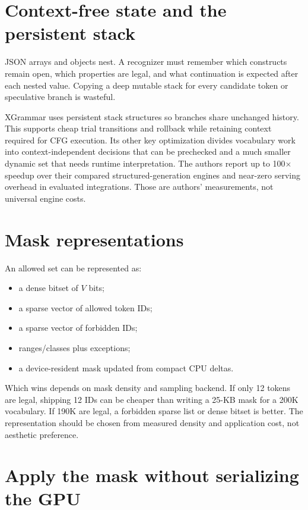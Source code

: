 \section{Context-free state and the persistent stack}

JSON arrays and objects nest. A recognizer must remember which constructs remain open,
which properties are legal, and what continuation is expected after each nested
value. Copying a deep mutable stack for every candidate token or speculative branch is
wasteful.

XGrammar uses persistent stack structures so branches share unchanged history. This
supports cheap trial transitions and rollback while retaining context required for CFG
execution. Its other key optimization divides vocabulary work into
context-independent decisions that can be prechecked and a much smaller dynamic set
that needs runtime interpretation. The authors report up to 100$\times$ speedup over
their compared structured-generation engines and near-zero serving overhead in
evaluated integrations. Those are authors' measurements, not universal engine costs.
\cite{dong2025xgrammar}

\section{Mask representations}

An allowed set can be represented as:
\begin{itemize}
\item a dense bitset of $V$ bits;
\item a sparse vector of allowed token IDs;
\item a sparse vector of forbidden IDs;
\item ranges/classes plus exceptions;
\item a device-resident mask updated from compact CPU deltas.
\end{itemize}

Which wins depends on mask density and sampling backend. If only 12 tokens are legal,
shipping 12 IDs can be cheaper than writing a 25-KB mask for a 200K vocabulary. If
190K are legal, a forbidden sparse list or dense bitset is better. The representation
should be chosen from measured density and application cost, not aesthetic preference.

\section{Apply the mask without serializing the GPU}

